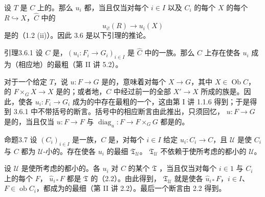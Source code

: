 设 $T$ 是 $C$ 上的。那么 $u_i$ 都，当且仅当对每个 $i\in I$ 以及 $C_i$ 的每个 $X$ 的每个 $R\hookrightarrow X$，$\widehat C$ 中的
\[
 u_{i!}(R)\longrightarrow u_i(X)
\]
是的（1.2 (ii)）。因此 3.6 是以下引理的推论。

\begin{SGAresult}{引理}{3.6.1}
设 $C$ 是，$(u_i:F_i\to G_i)_{i\in I}$ 是 $\widehat C$ 中的一族。那么 $C$ 上存在使各 $u_i$ 成为（相应地）的最粗（第 II 讲 5.2）。
\end{SGAresult}
对于一个给定 $T$，说 $u:F\to G$ 是的，意味着对每个 $X\to G$，其中 $X\in\operatorname{Ob}C$，的 $F\times_GX\to X$ 是的；或者地，$C$ 中经过前一的全部 $X'\to X$ 所成的族是。因此，使各 $u_i:F_i\to G_i$ 成为的中存在最粗的一个，这由第 I 讲 1.1.6 得到；于是得到 3.6.1 中不带括号的断言。括号中的相应断言由此推出，只须回忆， $u:F\to G$ 是的，当且仅当 $u:F\to F$ 与 $\operatorname{diag}_u:F\to F\times_GG$ 都是的。

\begin{SGAresult}{命题}{3.7}
设 $(C_i)_{i\in I}$ 是一族，$C$ 是，对每个 $i\in I$ 给定 $u_i:C_i\to C$，且 $\mathcal U$ 是使 $C_i$ 与 $C$ 都为 $\mathcal U$-小的。存在使各 $u_i$ 的最细 $\mathfrak T_{\mathcal U}$。 $\mathfrak T_{\mathcal U}$ 不依赖于使所考虑的都小的 $\mathcal U$。
\end{SGAresult}
设 $\mathcal U$ 是使所考虑的都小的。各 $u_i$ 对 $C$ 的某个 $\mathfrak T$ ，当且仅当对每个 $i\in1$ 与 $C_i$ 上的每个 $F$， $\widehat u_{i*}F$ 都是 $\mathfrak T$ 的（2.2）。由此得到，
 $\mathfrak T_{\mathcal U}$ 就是使各 $\widehat u_{i*}F$，$i\in I$、$F\in\operatorname{ob}C_i$，都成为的最细（第 II 讲 2.2）。最后一个断言由 2.2 得到。

